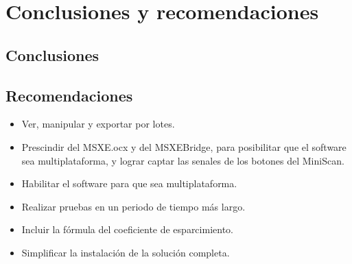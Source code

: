 \chapter{Conclusiones y recomendaciones}

\capV

\section{Conclusiones}

\section{Recomendaciones}

\begin{itemize}

	\item Ver, manipular y exportar por lotes.
	
	\item Prescindir del MSXE.ocx y del MSXEBridge, para posibilitar que el software sea multiplataforma, y lograr captar las senales de los botones del MiniScan.
	
	\item Habilitar el software para que sea multiplataforma.
	
	\item Realizar pruebas en un periodo de tiempo m\'{a}s largo.
	
	\item Incluir la f\'{o}rmula del coeficiente de esparcimiento.
	
	\item Simplificar la instalaci\'{o}n de la soluci\'{o}n completa.
\end{itemize}